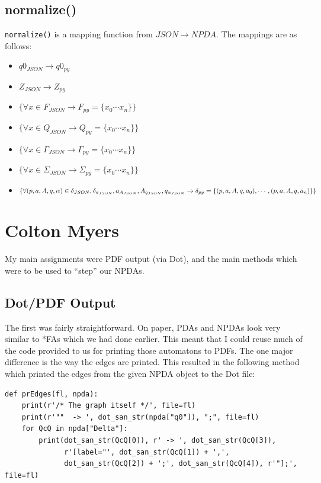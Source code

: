 \documentclass[a4paper]{article}
\begin{document}
\subsection{normalize()}
\texttt{normalize()} is a mapping function from $JSON\rightarrow NPDA$. The
mappings are as follows:
\begin{itemize}
    \item $q0_{JSON}\rightarrow q0_{py}$
    \item $Z_{JSON}\rightarrow Z_{py}$
    \item $\{\forall x\in F_{JSON} \rightarrow F_{py}=\{x_0\cdots x_n\}\}$
    \item $\{\forall x\in Q_{JSON} \rightarrow Q_{py}=\{x_0\cdots x_n\}\}$
    \item $\{\forall x\in\Gamma_{JSON} \rightarrow \Gamma_{py}=\{x_0\cdots x_n\}\}$
    \item $\{\forall x\in\Sigma_{JSON} \rightarrow \Sigma_{py}=\{x_0\cdots x_n\}\}$
    \item $\{\forall (p,a,A,q,\alpha)\in\delta_{JSON},\delta_{a_{JSON}},
                a_{A_{JSON}},
                A_{q_{JSON}},
                q_{\alpha_{JSON}} \rightarrow\\
                \delta_{py}=\{(p,a,A,q,a_0),\cdots,(p,a,A,q,a_n)\}\}$
\end{itemize}

\section{Colton Myers}

My main assignments were PDF output (via Dot), and the main methods which were
to be used to ``step'' our NPDAs.

\subsection{Dot/PDF Output}

The first was fairly straightforward.  On paper, PDAs and NPDAs look
very similar to *FAs which we had done earlier. This meant that I could reuse
much of the code provided to us for printing those automatons to PDFs.  The
one major difference is the way the edges are printed.  This resulted in the
following method which printed the edges from the given NPDA object to the Dot
file:

\begin{verbatim}
def prEdges(fl, npda):
    print(r'/* The graph itself */', file=fl)
    print(r'""  -> ', dot_san_str(npda["q0"]), ";", file=fl)
    for QcQ in npda["Delta"]:
        print(dot_san_str(QcQ[0]), r' -> ', dot_san_str(QcQ[3]),
              r'[label="', dot_san_str(QcQ[1]) + ',',
              dot_san_str(QcQ[2]) + ';', dot_san_str(QcQ[4]), r'"];', file=fl)
\end{verbatim}
\end{document}
